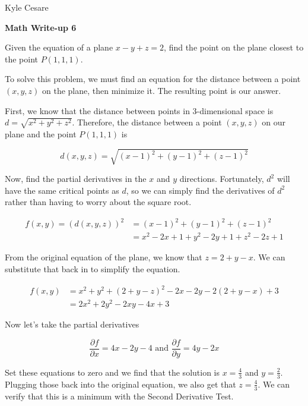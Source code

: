 \documentclass[11pt]{article}
\begin{document}
\begin{flushright}
  Kyle Cesare
\end{flushright}

{\center \textbf{Math Write-up 6} \\}

Given the equation of a plane $x - y + z = 2$, find the point on the plane
closest to the point $P(1, 1, 1)$.

\vspace{8mm}

To solve this problem, we must find an equation for the distance between a point
$(x, y, z)$ on the plane, then minimize it.  The resulting point is our answer.

\vspace{2mm}

First, we know that the distance between points in 3-dimensional space is
$d=\sqrt{x^2 + y^2 + z^2}$.  Therefore, the distance between a point $(x, y, z)$
on our plane and the point $P(1, 1, 1)$ is

$$
  d(x, y, z) = \sqrt{(x-1)^2 + (y-1)^2 + (z-1)^2}
$$

Now, find the partial derivatives in the $x$ and $y$ directions.  Fortunately,
$d^2$ will have the same critical points as $d$, so we can simply find the
derivatives of $d^2$ rather than having to worry about the square root.

\begin{align*}
  f(x, y) = (d(x, y, z))^2 &= (x-1)^2 + (y-1)^2 + (z-1)^2 \\
                           &= x^2 - 2x + 1 + y^2 - 2y + 1 + z^2 -2z + 1
\end{align*}

From the original equation of the plane, we know that $z = 2 + y - x$.  We can
substitute that back in to simplify the equation.

\begin{align*}
  f(x, y) &= x^2 + y^2 + (2 + y - z)^2 - 2x - 2y - 2(2 + y - x) + 3 \\
          &= 2x^2 + 2y^2 - 2xy - 4x + 3
\end{align*}

Now let's take the partial derivatives

$$
  \frac{\partial f}{\partial x} = 4x - 2y - 4 \text{ and }
  \frac{\partial f}{\partial y} = 4y - 2x
$$

Set these equations to zero and we find that the solution is $x = \frac{4}{3}$
and $y = \frac{2}{3}$.  Plugging those back into the original equation, we also
get that $z = \frac{4}{3}$.  We can verify that this is a minimum with the
Second Derivative Test.
\end{document}
